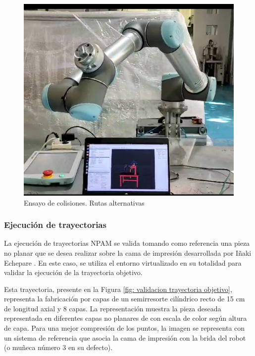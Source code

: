 \begin{figure}[h!]
    \centering
    \includegraphics[scale=0.50]{figuras/ensayo colisiones rutas alternativas.png}
    \caption{Ensayo de colisiones. Rutas alternativas}
    \label{fig: ensayo colisiones rutas alternativas}
\end{figure}


\subsubsection*{Ejecución de trayectorias}
\hypertarget{Ejecución de trayectorias ensayo}{}
\label{sec: resultados ejecución de trayectorias}

La ejecución de trayectorias \acrshort{NPAM} se valida tomando como referencia una pieza no planar que se desea realizar sobre la cama de impresión desarrollada por Iñaki Echepare \cite{TFM_IñakiEchepare}. En este caso, se utiliza el entorno virtualizado en su totalidad para validar la ejecución de la trayectoria objetivo. 

Esta trayectoria, presente en la Figura \ref{fig: validacion trayectoria objetivo}, representa la fabricación por capas de un semirresorte cilíndrico recto de 15 cm de longitud axial y 8 capas. La representación muestra la pieza deseada representada en diferentes capas no planares de con escala de color según altura de capa. Para una mejor compresión de los puntos, la imagen se representa con un sistema de referencia que asocia la cama de impresión con la brida del robot (o muñeca número 3 en su defecto).

